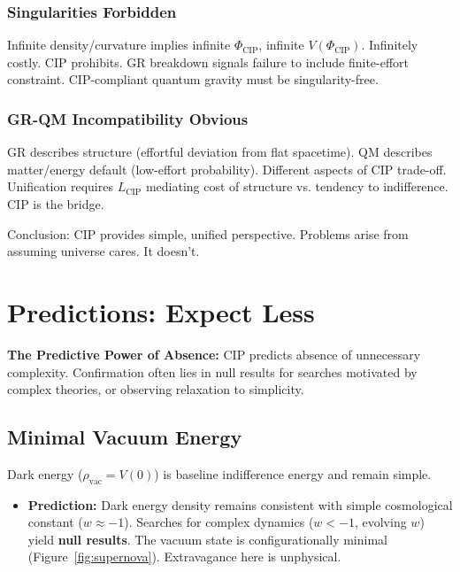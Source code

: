 \documentclass[11pt, a4paper]{article}
\newcommand{\subt}[1]{\mathrm{#1}}
\begin{document}
\subsubsection{Singularities Forbidden}
Infinite density/curvature implies infinite $\Phi_{\subt{CIP}}$, infinite $V(\Phi_{\subt{CIP}})$. Infinitely costly. CIP prohibits. GR breakdown signals failure to include finite-effort constraint. CIP-compliant quantum gravity must be singularity-free.

\subsubsection{GR-QM Incompatibility Obvious}
GR describes structure (effortful deviation from flat spacetime). QM describes matter/energy default (low-effort probability). Different aspects of CIP trade-off. Unification requires $L_{\subt{CIP}}$ mediating cost of structure vs. tendency to indifference. CIP is the bridge.

Conclusion: CIP provides simple, unified perspective. Problems arise from assuming universe cares. It doesn't.

\section{Predictions: Expect Less} \label{sec:predictions}

\textbf{The Predictive Power of Absence:} CIP predicts absence of unnecessary complexity. Confirmation often lies in null results for searches motivated by complex theories, or observing relaxation to simplicity.

\subsection{Minimal Vacuum Energy} \label{sec:pred_vac}
Dark energy ($\rho_{\subt{vac}} = V(0)$) is baseline indifference energy and remain simple.
\begin{itemize}
    \item \textbf{Prediction:} Dark energy density remains consistent with simple cosmological constant ($w \approx -1$). Searches for complex dynamics ($w < -1$, evolving $w$) yield \textbf{null results}. The vacuum state is configurationally minimal (Figure~\ref{fig:supernova}). Extravagance here is unphysical.
\end{itemize}
\end{document}
